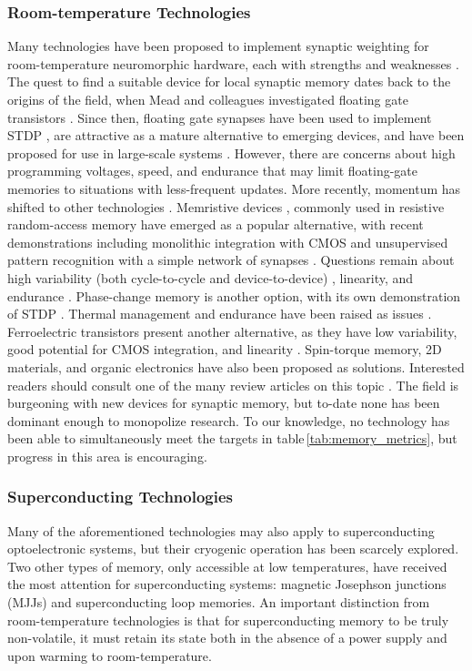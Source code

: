 \documentclass[twocolumn]{article}
\begin{document}
\subsubsection{Room-temperature Technologies}
Many technologies have been proposed to implement synaptic weighting for room-temperature neuromorphic hardware, each with strengths and weaknesses \cite{upadhyay2019emerging}. The quest to find a suitable device for local synaptic memory dates back to the origins of the field, when Mead and colleagues investigated floating gate transistors \cite{diorio1998floating}. Since then, floating gate synapses have been used to implement STDP \cite{ramakrishnan2011floating}, are attractive as a mature alternative to emerging devices, and have been proposed for use in large-scale systems \cite{hasler2013finding}. However, there are concerns about high programming voltages, speed, and endurance that may limit floating-gate memories to situations with less-frequent updates. More recently, momentum has shifted to other technologies \cite{zahoor2020resistive}.  Memristive devices \cite{stsn2008,yast2012,ab2018}, commonly used in resistive random-access memory have emerged as a popular alternative, with recent demonstrations including monolithic integration with CMOS \cite{yin2019monolithically} and unsupervised pattern recognition with a simple network of synapses \cite{ielmini2018brain}. Questions remain about high variability (both cycle-to-cycle and device-to-device) \cite{dalgaty2019hybrid}, linearity, and endurance \cite{zahoor2020resistive}. Phase-change memory is another option, with its own demonstration of STDP \cite{ambrogio2016unsupervised}. Thermal management and endurance have been raised as issues \cite{upadhyay2019emerging, zahoor2020resistive}. Ferroelectric transistors present another alternative, as they have low variability, good potential for CMOS integration, and linearity \cite{kim2019ferroelectric}.  Spin-torque memory, 2D materials, and organic electronics have also been proposed as solutions. Interested readers should consult one of the many review articles on this topic \cite{kim2018recent, upadhyay2019emerging, zhang2020brain}. The field is burgeoning with new devices for synaptic memory, but to-date none has been dominant enough to monopolize research. To our knowledge, no technology has been able to simultaneously meet the targets in table\,\ref{tab:memory_metrics}, but progress in this area is encouraging.

\subsubsection{Superconducting Technologies}
Many of the aforementioned technologies may also apply to superconducting optoelectronic systems, but their cryogenic operation has been scarcely explored. Two other types of memory, only accessible at low temperatures, have received the most attention for superconducting systems: magnetic Josephson junctions (MJJs) and superconducting loop memories. An important distinction from room-temperature technologies is that for superconducting memory to be truly non-volatile, it must retain its state both in the absence of a power supply and upon warming to room-temperature.
\end{document}
